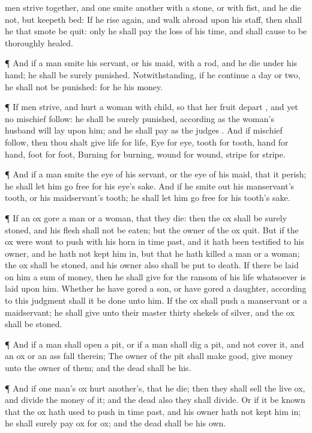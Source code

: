 {men
strive together, and
one
smite
another with a
stone,
or with
{}
fist, and he
die not, but
keepeth
{}
bed:
If he rise
again, and
walk
abroad upon his
staff, then shall he that
smote
{} be
quit: only he shall
pay
{} the loss of his
time, and shall cause
{} to be
thoroughly
healed.
\par }{\PP {}¶ And if a
man
smite his
servant, or his
maid, with a
rod, and he
die under his
hand; he shall be
surely
punished.
Notwithstanding, if he
continue a
day or
two, he shall not be
punished: for he
{} his
money.
\par }{\PP {}¶ If
men
strive, and
hurt a
woman with
child, so that her
fruit
depart
{}, and yet no mischief
follow: he shall be
surely
punished, according as the
woman’s
husband will
lay upon him; and he shall
pay as the
judges
{}.
And if
{} mischief
follow, then thou shalt
give
life for
life,
Eye for
eye,
tooth for
tooth,
hand for
hand,
foot for
foot,
Burning for
burning,
wound for
wound,
stripe for
stripe.
\par }{\PP {}¶ And if a
man
smite the
eye of his
servant, or the
eye of his
maid, that it
perish; he shall let him
go
free
for his
eye’s sake.
And if he
smite out his
manservant’s
tooth, or his
maidservant’s
tooth; he shall let him
go
free for his
tooth’s sake.
\par }{\PP {}¶ If an
ox
gore a
man or a
woman, that they
die: then the
ox shall be
surely
stoned, and his
flesh shall not be
eaten; but the
owner of the
ox
{}
quit.
But if the
ox were wont to push with his
horn in time
past, and it hath been
testified to his
owner, and he hath not
kept him in, but that he hath
killed a
man or a
woman; the
ox shall be
stoned, and his
owner also shall be put to
death.
If there be
laid on him a sum of
money, then he shall
give for the
ransom of his
life whatsoever is
laid upon him.
Whether he have
gored a
son,
or have
gored a
daughter, according to this
judgment shall it be
done unto him.
If the
ox shall
push a
manservant or a
maidservant; he shall
give unto their
master
thirty
shekels of
silver, and the
ox shall be
stoned.
\par }{\PP {}¶ And if a
man shall
open a
pit, or if a
man shall
dig a
pit, and not
cover it, and an
ox or an
ass
fall therein;
The
owner of the
pit shall make
{}
good,
{}
give
money unto the
owner of them; and the
dead
{} shall be his.
\par }{\PP {}¶ And if one
man’s
ox
hurt
another’s, that he
die; then they shall
sell the
live
ox, and
divide the
money of it; and the
dead
{} also they shall
divide.
Or if it be
known that the
ox hath used to
push in time
past, and his
owner hath not
kept him in; he shall
surely
pay
ox for
ox; and the
dead shall be his own.

}
